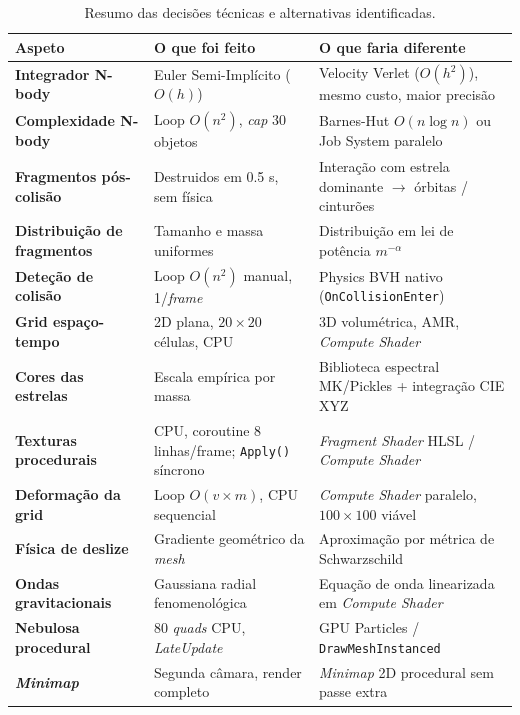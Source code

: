 \documentclass[12pt,a4paper]{article}
\begin{document}
\begin{table}[h!]
\centering
\renewcommand{\arraystretch}{1.35}
\begin{tabular}{>{\bfseries}p{3.0cm} p{4.0cm} p{6.5cm}}
\toprule
Aspeto & O que foi feito & O que faria diferente \\
\midrule
Integrador N-body & Euler Semi-Impl\'icito ($O(h)$) & Velocity Verlet ($O(h^2)$), mesmo custo, maior precis\~{a}o \\
Complexidade N-body & Loop $O(n^2)$, \textit{cap} 30 objetos & Barnes-Hut $O(n \log n)$ ou Job System paralelo \\
Fragmentos p\'{o}s-colis\~{a}o & Destruidos em 0.5 s, sem f\'{i}sica & Intera\c{c}\~{a}o com estrela dominante $\rightarrow$ \'{o}rbitas / cin\-tur\~{o}es \\
Distribui\c{c}\~{a}o de fragmentos & Tamanho e massa uniformes & Distribui\c{c}\~{a}o em lei de pot\^{e}ncia $m^{-\alpha}$ \\
Dete\c{c}\~{a}o de colis\~{a}o & Loop $O(n^2)$ manual, 1/\textit{frame} & Physics BVH nativo (\texttt{OnCollisionEnter}) \\
Grid espa\c{c}o-tempo & 2D plana, $20{\times}20$ c\'{e}lulas, CPU & 3D volum\'{e}trica, AMR, \textit{Compute Shader} \\
Cores das estrelas & Escala emp\'{i}rica por massa & Biblioteca espectral MK/Pickles \cite{pickles1998} + integra\c{c}\~{a}o CIE XYZ \\
Texturas procedurais & CPU, coroutine 8 linhas/frame; \texttt{Apply()} s\'{i}ncrono & \textit{Fragment Shader} HLSL / \textit{Compute Shader} \\
Deforma\c{c}\~{a}o da grid & Loop $O(v{\times}m)$, CPU sequencial & \textit{Compute Shader} paralelo, $100{\times}100$ vi\'{a}vel \\
F\'{i}sica de deslize & Gradiente geom\'{e}trico da \textit{mesh} & Aproxima\c{c}\~{a}o por m\'{e}trica de Schwarzschild \\
Ondas gravitacionais & Gaussiana radial fenomenol\'{o}gica & Equa\c{c}\~{a}o de onda linearizada em \textit{Compute Shader} \\
Nebulosa procedural & 80 \textit{quads} CPU, \textit{LateUpdate} & GPU Particles / \texttt{DrawMeshInstanced} \\
\textit{Minimap} & Segunda c\^{a}mara, render completo & \textit{Minimap} 2D procedural sem passe extra \\
\bottomrule
\end{tabular}
\caption{Resumo das decis\~{o}es t\'{e}cnicas e alternativas identificadas.}
\end{table}
\end{document}
